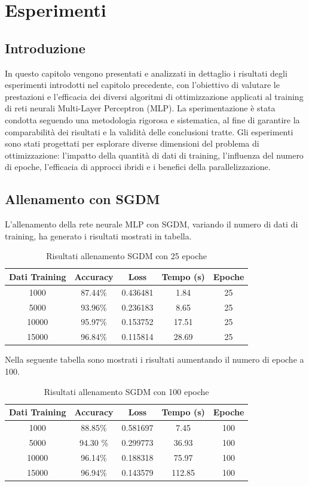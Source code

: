 \chapter{Esperimenti}

\section{Introduzione}
In questo capitolo vengono presentati e analizzati in dettaglio i risultati degli esperimenti introdotti nel capitolo precedente, con l'obiettivo di valutare le prestazioni e l'efficacia dei diversi algoritmi di ottimizzazione applicati al training di reti neurali Multi-Layer Perceptron (MLP).
La sperimentazione è stata condotta seguendo una metodologia rigorosa e sistematica, al fine di garantire la comparabilità dei risultati e la validità delle conclusioni tratte. Gli esperimenti sono stati progettati per esplorare diverse dimensioni del problema di ottimizzazione: l'impatto della quantità di dati di training, l'influenza del numero di epoche, l'efficacia di approcci ibridi e i benefici della parallelizzazione.

\section{Allenamento con SGDM}
 L'allenamento della rete neurale MLP con SGDM, variando il numero di dati di training, ha generato i risultati mostrati in tabella. 
\begin{table}[htbp]
\centering
\begin{tabular}{|c|c|c|c|c|}
\hline
\textbf{Dati Training} & \textbf{Accuracy} & \textbf{Loss} & \textbf{Tempo (s)} & \textbf{Epoche} \\
\hline
1000 & 87.44\% & 0.436481 & 1.84 & 25 \\
\hline
5000 & 93.96\% & 0.236183 &  8.65 & 25 \\
\hline
10000 & 95.97\% & 0.153752 & 17.51 & 25 \\
\hline
15000 & 96.84\% &  0.115814 &28.69 & 25 \\
\hline
\end{tabular}
\label{tab:sgdm_results con 25 epoche}
\caption{Risultati allenamento SGDM con 25 epoche}
\end{table}

\newpage
Nella seguente tabella sono mostrati i risultati aumentando il numero di epoche a 100.
\begin{table}[htbp]
\centering
\begin{tabular}{|c|c|c|c|c|}
\hline
\textbf{Dati Training} & \textbf{Accuracy} & \textbf{Loss} & \textbf{Tempo (s)} & \textbf{Epoche} \\
\hline
1000 & 88.85\% & 0.581697 & 7.45 & 100 \\
\hline
5000 & 94.30 \% & 0.299773 &  36.93 & 100 \\
\hline
10000 & 96.14\% & 0.188318 & 75.97 & 100 \\
\hline
15000 & 96.94\% &  0.143579 & 112.85 & 100 \\
\hline
\end{tabular}
\label{tab:sgdm_results con 100 epoche}
\caption{Risultati allenamento SGDM con 100 epoche}
\end{table}

